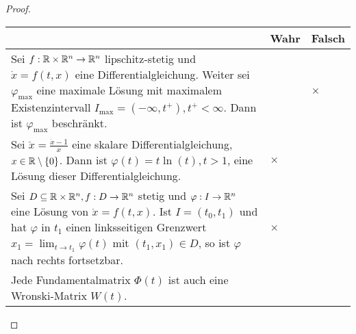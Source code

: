 \begin{proof}\noindent
	
		\begin{tabularx}{\textwidth}{X|p{2cm}|p{2cm}|}
	& Wahr & Falsch \\\hline
	Sei $f : \mathbb{R} \times \mathbb{R}^n\to  \mathbb{R}^n$ lipschitz-stetig und $\dot{x} = f (t, x)$ eine Differentialgleichung.
	Weiter sei $\varphi_\text{max}$ eine maximale Lösung mit maximalem Existenzintervall	$I_\text{max} = (-\infty, t^+ ), t^+ < \infty$. Dann ist $\varphi_\text{max}$ beschränkt. & & $\times$ \\\hline
	Sei $\ddot{x} = \frac{\dot{x}-1}{x}$ eine skalare Differentialgleichung, $x \in \mathbb{R} \setminus \{0\}$. Dann ist $\varphi(t) = t \ln(t), t > 1$, eine Lösung dieser Differentialgleichung. & $\times$ & \\\hline
	Sei $D \subseteq \mathbb{R} \times \mathbb{R}^n , f : D \to \mathbb{R}^n$ stetig und $\varphi : I \to \mathbb{R}^n$ eine Lösung von $\dot{x} = f (t, x)$. Ist $I = (t_0, t_1)$ und hat $\varphi$ in $t_1$ einen linksseitigen Grenzwert $x_1 = \lim_{t\to t_1} \varphi(t)$ mit $(t_1 , x_1 ) \in D$, so ist $\varphi$ nach rechts fortsetzbar. & $\times$ & \\\hline
	Jede Fundamentalmatrix $\Phi(t)$ ist auch eine Wronski-Matrix $W(t)$. & & \\\hline
\end{tabularx}
\end{proof}
